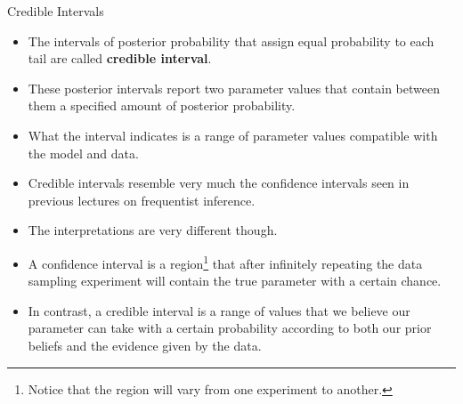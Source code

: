 \documentclass[handout]{beamer}
\begin{document}
\begin{frame}[fragile]{Credible Intervals}
\scriptsize{
\begin{itemize}

\item The intervals of posterior probability that assign equal probability to each tail are called \textbf{credible interval}.

\item These posterior intervals report two parameter values that contain between them a specified amount of posterior probability.

\item What the interval indicates is a range of parameter values compatible with the model and data.

\item Credible intervals resemble very much the confidence intervals seen in previous lectures on frequentist inference.

\item The interpretations are very different though.

\item A confidence interval is a region\footnote{Notice that the region will vary from one experiment to another.} that after infinitely repeating the data sampling experiment will contain the true parameter with a certain chance.


\item In contrast, a credible interval is a range of values that we believe our parameter can take with a certain probability according to both our prior beliefs and the evidence given by the data.

\end{itemize}



} 

\end{frame}
\end{document}
